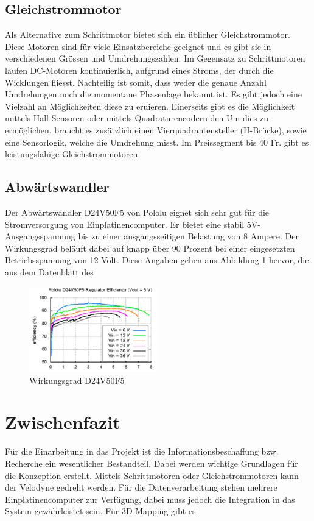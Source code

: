 \subsection{Gleichstrommotor}
Als Alternative zum Schrittmotor bietet sich ein üblicher Gleichstrommotor. Diese Motoren sind für viele Einsatzbereiche geeignet und es gibt sie in verschiedenen Grössen und Umdrehungszahlen. Im Gegensatz zu Schrittmotoren laufen DC-Motoren kontinuierlich, aufgrund eines Stroms, der durch die Wicklungen fliesst. Nachteilig ist somit, dass weder die genaue Anzahl Umdrehungen noch die momentane Phasenlage bekannt ist. Es gibt jedoch eine Vielzahl an Möglichkeiten diese zu eruieren. Einerseits gibt es die Möglichkeit mittels Hall-Sensoren oder mittels Quadraturencodern den  Um dies zu ermöglichen, braucht es zusätzlich einen Vierquadrantensteller (H-Brücke), sowie eine Sensorlogik, welche die Umdrehung misst. Im Preissegment bis 40 Fr. gibt es leistungsfähige Gleichstrommotoren

\subsection{Abwärtswandler}
Der Abwärtswandler D24V50F5 von Pololu eignet sich sehr gut für die Stromversorgung von Einplatinencomputer. Er bietet eine stabil 5V-Ausgangsspannung bis zu einer ausgangsseitigen Belastung von 8 Ampere. Der Wirkungsgrad beläuft dabei auf knapp über 90 Prozent bei einer eingesetzten Betriebsspannung von 12 Volt. Diese Angaben gehen aus Abbildung \ref{fig:D24V50F5} hervor, die aus dem Datenblatt des  

\begin{figure}[H]
	\centering
	\includegraphics[width=0.5\textwidth]
	{resources/D24V50F5.PNG}
	\caption[Wirkungsgrad D24V50F5]{Wirkungsgrad D24V50F5 \protect\cite{D24V50F5}}
	\label{fig:D24V50F5}
\end{figure}



\section{Zwischenfazit}
\label{ZwischenfazitInfo}
Für die Einarbeitung in das Projekt ist die Informationsbeschaffung bzw. Recherche ein wesentlicher Bestandteil. Dabei werden wichtige Grundlagen für die Konzeption erstellt. Mittels Schrittmotoren oder Gleichstrommotoren kann der Velodyne gedreht werden. Für die Datenverarbeitung stehen mehrere Einplatinencomputer zur Verfügung, dabei muss jedoch die Integration in das System gewährleistet sein. Für 3D Mapping gibt es  
